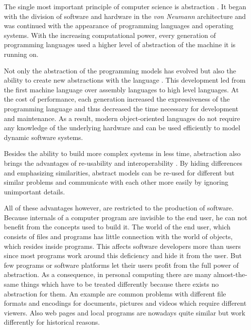 The single most important principle of computer science is abstraction \cite{ComputingDiscipline, abstractionInCs, StructureOfComputerPrograms}. It began with the division of software and hardware in the \textit{von Neumann} architecture and was continued with the appearance of programming languages and operating systems. With the increasing computational power, every generation of programming languages used a higher level of abstraction of the machine it is running on. 

Not only the abstraction of the programming models has evolved but also the ability to create new abstractions with the language \cite{Generations}. This development led from the first machine language over assembly languages to high level languages. At the cost of performance, each generation increased the expressiveness of the programming language and thus decreased the time necessary for development and maintenance. As a result, modern object-oriented languages do not require any knowledge of the underlying hardware and can be used efficiently to model dynamic software systems.

Besides the ability to build more complex systems in less time, abstraction also brings the advantages of re-usability and interoperability \cite{PowerOfAbstraction}. By hiding differences and emphasizing similarities, abstract models can be re-used for different but similar problems and communicate with each other more easily by ignoring unimportant details.

All of these advantages however, are restricted to the production of software. Because internals of a computer program are invisible to the end user, he can not benefit from the concepts used to build it. The world of the end user, which consists of files and programs has little connection with the world of objects, which resides inside programs. This affects software developers more than users since most programs work around this deficiency and hide it from the user. But few programs or software platforms let their users profit from the full power of abstraction. As a consequence, in personal computing there are many almost-the-same things which have to be treated differently because there exists no abstraction for them. An example are common problems with different file formats and encodings for documents, pictures and videos which require different viewers. Also web pages and local programs are nowadays quite similar but work differently for historical reasons.

